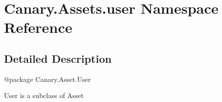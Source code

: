 \hypertarget{namespace_canary_1_1_assets_1_1user}{\section{Canary.\-Assets.\-user Namespace Reference}
\label{namespace_canary_1_1_assets_1_1user}
}


\subsection{Detailed Description}
\begin{DoxyVerb}@package Canary.Asset.User

User is a subclass of Asset
\end{DoxyVerb}
 